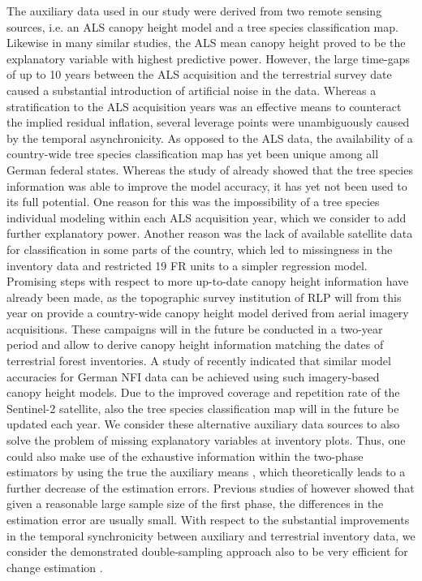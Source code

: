 The auxiliary data used in our study were derived from two remote sensing sources, i.e. an ALS canopy height model and a tree species classification map. Likewise in many similar studies, the ALS mean canopy height proved to be the explanatory variable with highest predictive power. However, the large time-gaps of up to 10 years between the ALS acquisition and the terrestrial survey date caused a substantial introduction of artificial noise in the data. Whereas a stratification to the ALS acquisition years was an effective means to counteract the implied residual inflation, several leverage points were unambiguously caused by the temporal asynchronicity. As opposed to the ALS data, the availability of a country-wide tree species classification map has yet been unique among all German federal states. Whereas the study of \citet{hill2017a} already showed that the tree species information was able to improve the model accuracy, it has yet not been used to its full potential. One reason for this was the impossibility of a tree species individual modeling within each ALS acquisition year, which we consider to add further explanatory power. Another reason was the lack of available satellite data for classification in some parts of the country, which led to missingness in the inventory data and restricted 19 FR units to a simpler regression model. Promising steps with respect to more up-to-date canopy height information have already been made, as the topographic survey institution of RLP will from this year on provide a country-wide canopy height model derived from aerial imagery acquisitions. These campaigns will in the future be conducted in a two-year period and allow to derive canopy height information matching the dates of terrestrial forest inventories. A study of \citet{kirchhoefer2017} recently indicated that similar model accuracies for German NFI data can be achieved using such imagery-based canopy height models. Due to the improved coverage and repetition rate of the Sentinel-2 satellite, also the tree species classification map will in the future be updated each year. We consider these alternative auxiliary data sources to also solve the problem of missing explanatory variables at inventory plots. Thus, one could also make use of the exhaustive information within the two-phase estimators by using the true the auxiliary means \citep{mandallaz2013a, mandallaz2013b}, which theoretically leads to a further decrease of the estimation errors. Previous studies of \citet{mandallaz2013b} however showed that given a reasonable large sample size of the first phase, the differences in the estimation error are usually small. With respect to the substantial improvements in the temporal synchronicity between auxiliary and terrestrial inventory data, we consider the demonstrated double-sampling approach also to be very efficient for change estimation \citep{massey2015b}.\par


